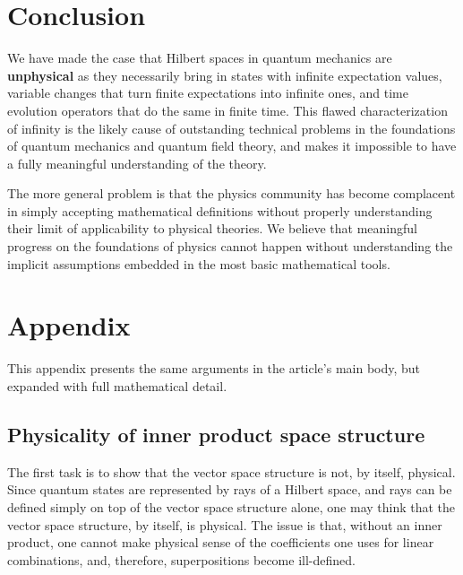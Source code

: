 \documentclass[10pt,twocolumn, nofootinbib]{revtex4-2}
\begin{document}
\section{Conclusion}

We have made the case that Hilbert spaces in quantum mechanics are \textbf{unphysical} as they necessarily bring in states with infinite expectation values, variable changes that turn finite expectations into infinite ones, and time evolution operators that do the same in finite time. This flawed characterization of infinity is the likely cause of outstanding technical problems in the foundations of quantum mechanics and quantum field theory, and makes it impossible to have a fully meaningful understanding of the theory.

The more general problem is that the physics community has become complacent in simply accepting mathematical definitions without properly understanding their limit of applicability to physical theories. We believe that meaningful progress on the foundations of physics cannot happen without understanding the implicit assumptions embedded in the most basic mathematical tools.



\newcommand{\pj}[1] {\underbar{$#1$}}

\section*{Appendix}

This appendix presents the same arguments in the article's main body, but expanded with full mathematical detail.

\subsection{Physicality of inner product space structure}

The first task is to show that the vector space structure is not, by itself, physical. Since quantum states are represented by rays of a Hilbert space, and rays can be defined simply on top of the vector space structure alone, one may think that the vector space structure, by itself, is physical. The issue is that, without an inner product, one cannot make physical sense of the coefficients one uses for linear combinations, and, therefore, superpositions become ill-defined.
\end{document}
